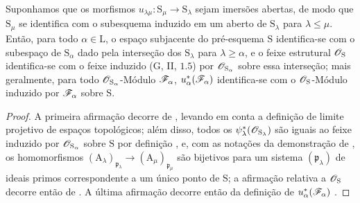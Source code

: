 \begin{proposition}[8.2.13]
\label{IV.8.2.13}
Suponhamos que os morfismos $u_{\lambda\mu}:\mathrm{S}_\mu\to\mathrm{S}_\lambda$ sejam imersões abertas, de modo que $\mathrm{S}_\mu$ se identifica com o subesquema induzido em um aberto de $\mathrm{S}_\lambda$ para $\lambda\leqslant\mu$.
Então, para todo $\alpha\in\mathrm{L}$, o espaço subjacente do pré-esquema $\mathrm{S}$ identifica-se com o subespaço de $\mathrm{S}_\alpha$ dado pela interseção dos $\mathrm{S}_\lambda$ para $\lambda\geqslant\alpha$, e o feixe estrutural $\mathscr{O}_\mathrm{S}$ identifica-se com o feixe induzido \textnormal{(}$\mathrm{G}$, II, $1.5$\textnormal{)} por $\mathscr{O}_{\mathrm{S}_\alpha}$ sobre essa interseção; mais geralmente, para todo $\mathscr{O}_{\mathrm{S}_\alpha}$-Módulo $\mathscr{F}_\alpha$, $u_\alpha^*(\mathscr{F}_\alpha)$ identifica-se com o $\mathscr{O}_\mathrm{S}$-Módulo induzido por $\mathscr{F}_\alpha$ sobre $\mathrm{S}$.
\end{proposition}

\begin{proof}
A primeira afirmação decorre de , levando em conta a definição de limite projetivo de espaços topológicos; além disso, todos os $\psi_\lambda^*(\mathscr{O}_{\mathrm{S}_\lambda})$ são iguais ao feixe induzido por $\mathscr{O}_{\mathrm{S}_\alpha}$ sobre $\mathrm{S}$ por definição , e, com as notações da demonstração de , os homomorfismos $(\mathrm{A}_\lambda)_{\mathfrak{p}_\lambda}\to(\mathrm{A}_\mu)_{\mathfrak{p}_\mu}$ são bijetivos para um sistema $(\mathfrak{p}_\lambda)$ de ideais primos correspondente a um único ponto de $\mathrm{S}$; a afirmação relativa a $\mathscr{O}_\mathrm{S}$ decorre então de .
A última afirmação decorre então da definição de $u_\alpha^*(\mathscr{F}_\alpha)$ .
\end{proof}

